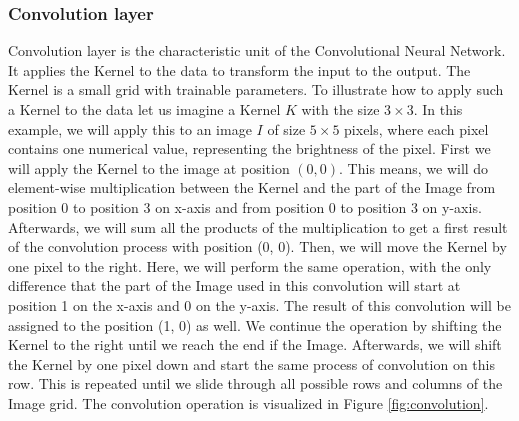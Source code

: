 \subsubsection{Convolution layer}
Convolution layer is the characteristic unit of the Convolutional Neural Network.
It applies the Kernel to the data to transform the input to the output.
The Kernel is a small grid with trainable parameters.
To illustrate how to apply such a Kernel to the data let us imagine a Kernel $K$ with the size $3 \times 3$.
In this example, we will apply this to an image $I$ of size $5 \times 5$ pixels, where each pixel contains one numerical value, representing the brightness of the pixel.
First we will apply the Kernel to the image at position $(0, 0)$.
This means, we will do element-wise multiplication between the Kernel and the part of the Image from position 0 to position 3 on x-axis and from position 0 to position 3 on y-axis.
Afterwards, we will sum all the products of the multiplication to get a first result of the convolution process with position (0, 0).
Then, we will move the Kernel by one pixel to the right.
Here, we will perform the same operation, with the only difference that the part of the Image used in this convolution will start at position 1 on the x-axis and 0 on the y-axis.
The result of this convolution will be assigned to the position (1, 0) as well.
We continue the operation by shifting the Kernel to the right until we reach the end if the Image.
Afterwards, we will shift the Kernel by one pixel down and start the same process of convolution on this row.
This is repeated until we slide through all possible rows and columns of the Image grid.
The convolution operation is visualized in Figure \ref{fig:convolution}.

